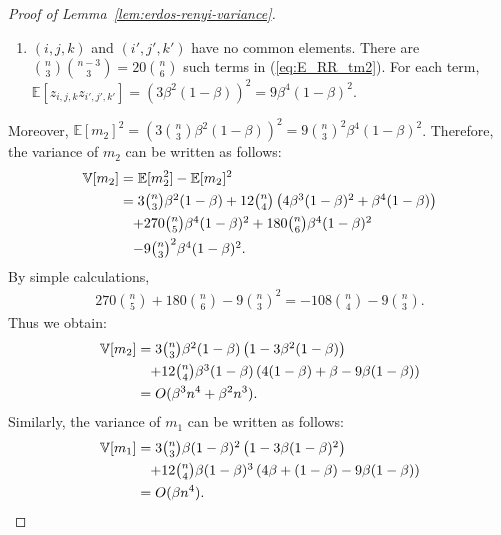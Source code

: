 {\begin{proof}[Proof of Lemma~\ref{lem:erdos-renyi-variance}]
\begin{enumerate}
	There are $n \binom{n-1}{2} \binom{n-3}{2} = 30\binom{n}{5}$ such terms in (\ref{eq:E_RR_tm2}).  For each term, $\mathbb{E}[z_{i,j,k}z_{i',j',k'}]=(3\beta^2(1-\beta))^2 = 9\beta^4(1-\beta)^2$. 
	\item $(i,j,k)$ and $(i',j',k')$ have no common elements. 
	There are $\binom{n}{3}\binom{n-3}{3} = 20\binom{n}{6}$ such terms in (\ref{eq:E_RR_tm2}). 
	For each term, $\mathbb{E}[z_{i,j,k}z_{i',j',k'}]=(3\beta^2(1-\beta))^2 = 9\beta^4(1-\beta)^2$. 
\end{enumerate}
Moreover, $\mathbb{E}[m_2]^2 = (3\binom{n}{3}\beta^2(1-\beta))^2 = 9\binom{n}{3}^2\beta^4(1-\beta)^2$. 
Therefore, the variance of $m_2$ can be written as follows:
\begin{align*}
  \mathbb{V}[m_2] 
  &= \mathbb{E}[m_2^2] - \mathbb{E}[m_2]^2 \nonumber\\
  &= \textstyle{3\binom{n}{3}\beta^2(1-\beta) + 12\binom{n}{4}\left(4\beta^3(1-\beta)^2 + \beta^4(1-\beta)\right)} \nonumber\\
  &\hspace{3.5mm} \textstyle{+ 270\binom{n}{5}\beta^4(1-\beta)^2 + 180\binom{n}{6}\beta^4(1-\beta)^2} \nonumber\\
  &\hspace{3.5mm} \textstyle{- 9\binom{n}{3}^2\beta^4(1-\beta)^2.}
\end{align*}
By simple calculations,
\begin{align*}
\textstyle{270\binom{n}{5} + 180\binom{n}{6} - 9\binom{n}{3}^2 = -108\binom{n}{4}-9\binom{n}{3}.}
\end{align*}
Thus we obtain:
\begin{align*}
\mathbb{V}[m_2] 
&= \textstyle{3\binom{n}{3}\beta^2(1-\beta)\left(1 - 3\beta^2(1-\beta)\right)} \nonumber\\
&\hspace{3.5mm} \textstyle{+ 12\binom{n}{4} \beta^3(1-\beta) \left(4(1-\beta) + \beta - 9\beta(1-\beta) \right)} \\
&= O(\beta^3 n^4 + \beta^2n^3).
\end{align*}
Similarly, the variance of $m_1$ can be written as follows:
\begin{align*}
\mathbb{V}[m_1] 
&= \textstyle{3\binom{n}{3}\beta(1-\beta)^2\left(1 - 3\beta(1-\beta)^2\right)} \nonumber\\
&\hspace{3.5mm} \textstyle{+ 12\binom{n}{4} \beta(1-\beta)^3 \left(4\beta +
(1-\beta) - 9\beta(1-\beta) \right)} \\
&= O(\beta n^4).
\end{align*}
\end{proof}

}

